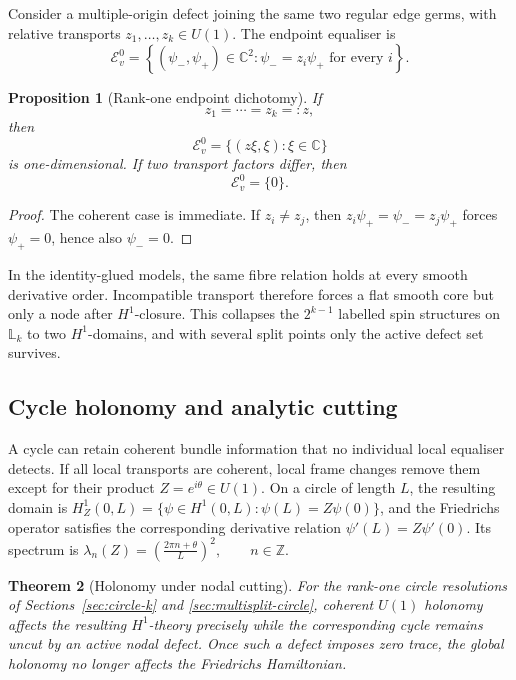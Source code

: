\documentclass[11pt]{article}
\theoremstyle{plain}
\newtheorem{theorem}{Theorem}[section]
\newtheorem{proposition}[theorem]{Proposition}
\theoremstyle{definition}
\begin{document}
Consider a multiple-origin defect joining the same two regular edge germs,
with relative transports
\(z_1,\ldots,z_k\in U(1)\).
The endpoint equaliser is
\[
  \mathcal E_v^0
  =
  \left\{
    (\psi_-,\psi_+)\in\mathbb C^2:
    \psi_-=z_i\psi_+
    \text{ for every }i
  \right\}.
\]

\begin{proposition}[Rank-one endpoint dichotomy]
\label{prop:rank-one-endpoint-dichotomy}
If
\[
  z_1=\cdots=z_k=:z,
\]
then
\[
  \mathcal E_v^0
  =
  \{(z\xi,\xi):\xi\in\mathbb C\}
\]
is one-dimensional. If two transport factors differ, then
\[
  \mathcal E_v^0=\{0\}.
\]
\end{proposition}

\begin{proof}
The coherent case is immediate. If \(z_i\neq z_j\), then \(z_i\psi_+=\psi_-=z_j\psi_+\) forces \(\psi_+=0\), hence also \(\psi_-=0\).
\end{proof}

In the identity-glued models, the same fibre relation holds at every smooth derivative order. Incompatible transport therefore forces a flat smooth core but only a node after \(H^1\)-closure. This collapses the \(2^{k-1}\) labelled spin structures on \(\mathbb L_k\) to two \(H^1\)-domains, and with several split points only the active defect set survives.



\subsection{Cycle holonomy and analytic cutting}
\label{subsec:bundle-cycle-holonomy}
\label{subsec:bundle-active-erases-holonomy}

A cycle can retain coherent bundle information that no individual local
equaliser detects. If all local transports are coherent, local frame changes
remove them except for their product
\(Z=e^{i\theta}\in U(1)\).
On a circle of length \(L\), the resulting domain is
\(H^1_Z(0,L) = \{\psi\in H^1(0,L):\psi(L)=Z\psi(0)\}\),
and the Friedrichs operator satisfies the corresponding derivative relation
\(\psi'(L)=Z\psi'(0)\).
Its spectrum is
\(\lambda_n(Z) = \left( \frac{2\pi n+\theta}{L} \right)^2, \qquad n\in\mathbb Z\).



\begin{theorem}[Holonomy under nodal cutting]
\label{thm:holonomy-cut-principle}
For the rank-one circle resolutions of
Sections~\ref{sec:circle-k} and \ref{sec:multisplit-circle}, coherent
\(U(1)\) holonomy affects the resulting \(H^1\)-theory precisely while the
corresponding cycle remains uncut by an active nodal defect. Once such a
defect imposes zero trace, the global holonomy no longer affects the
Friedrichs Hamiltonian.
\end{theorem}
\end{document}
